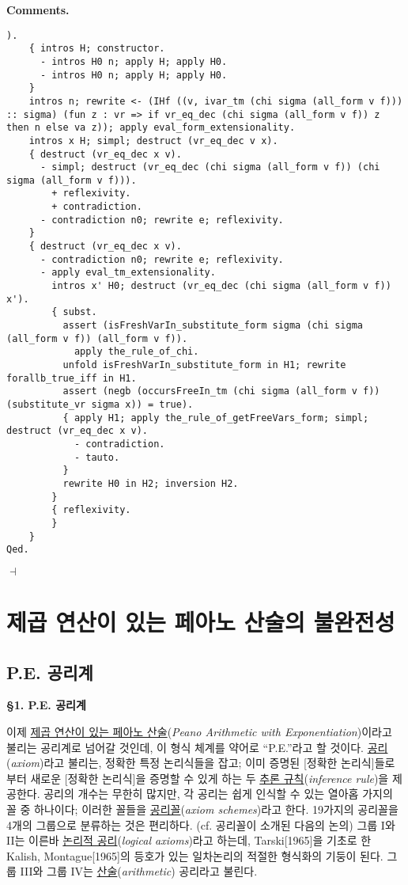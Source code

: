 \documentclass[12pt]{paper}
\newenvironment{context}[1][]{\noindent \textbf{{#1}.}}{\hfill $ \dashv $}
\begin{document}
\begin{context}[Comments]
\begin{lstlisting}[frame=single]
    ).
    { intros H; constructor.
      - intros H0 n; apply H; apply H0.
      - intros H0 n; apply H; apply H0.
    }
    intros n; rewrite <- (IHf ((v, ivar_tm (chi sigma (all_form v f))) :: sigma) (fun z : vr => if vr_eq_dec (chi sigma (all_form v f)) z then n else va z)); apply eval_form_extensionality.
    intros x H; simpl; destruct (vr_eq_dec v x).
    { destruct (vr_eq_dec x v).
      - simpl; destruct (vr_eq_dec (chi sigma (all_form v f)) (chi sigma (all_form v f))).
        + reflexivity.
        + contradiction.
      - contradiction n0; rewrite e; reflexivity.
    }
    { destruct (vr_eq_dec x v).
      - contradiction n0; rewrite e; reflexivity.
      - apply eval_tm_extensionality.
        intros x' H0; destruct (vr_eq_dec (chi sigma (all_form v f)) x').
        { subst.
          assert (isFreshVarIn_substitute_form sigma (chi sigma (all_form v f)) (all_form v f)).
            apply the_rule_of_chi.
          unfold isFreshVarIn_substitute_form in H1; rewrite forallb_true_iff in H1.
          assert (negb (occursFreeIn_tm (chi sigma (all_form v f)) (substitute_vr sigma x)) = true).
          { apply H1; apply the_rule_of_getFreeVars_form; simpl; destruct (vr_eq_dec x v).
            - contradiction.
            - tauto. 
          }
          rewrite H0 in H2; inversion H2.
        }
        { reflexivity.
        }
    }
Qed.
\end{lstlisting}
  \end{context}

  \section{제곱 연산이 있는 페아노 산술의 불완전성}

  \subsection{P.E. 공리계}

  \textbf{\S1. P.E. 공리계}

  이제 \underline{제곱 연산이 있는 페아노 산술}(\textit{Peano Arithmetic with Exponentiation})이라고 불리는 공리계로 넘어갈 것인데,
  이 형식 체계를 약어로 ``P.E.''라고 할 것이다.
  \underline{공리}(\textit{axiom})라고 불리는, 정확한 특정 논리식들을 잡고;
  이미 증명된 [정확한 논리식]들로부터 새로운 [정확한 논리식]을 증명할 수 있게 하는 두 \underline{추론 규칙}(\textit{inference rule})을 제공한다.
  공리의 개수는 무한히 많지만,
  각 공리는 쉽게 인식할 수 있는 열아홉 가지의 꼴 중 하나이다;
  이러한 꼴들을 \underline{공리꼴}(\textit{axiom schemes})라고 한다.
  19가지의 공리꼴을 4개의 그룹으로 분류하는 것은 편리하다. (cf. 공리꼴이 소개된 다음의 논의)
  그룹 I와 II는 이른바 \underline{논리적 공리}(\textit{logical axioms})라고 하는데,
  Tarski[1965]을 기초로 한 Kalish, Montague[1965]의 등호가 있는 일차논리의 적절한 형식화의 기둥이 된다.
  그룹 III와 그룹 IV는 \underline{산술}(\textit{arithmetic}) 공리라고 불린다.
\end{document}
